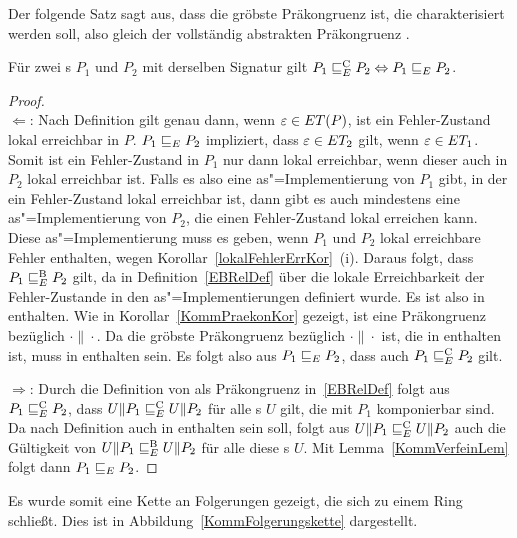 Der folgende Satz sagt aus, dass \ERel{} die gröbste Präkongruenz ist, die
charakterisiert werden soll, also gleich der vollständig abstrakten
Präkongruenz \ECRel{}.

\begin{Satz}
  \label{KommVollAbstraktSatz}
  Für zwei \MEIO{}s $P_1$ und $P_2$ mit derselben Signatur gilt $P_1 \sqsubseteq  _E^\mathrm{C}
  P_2\Leftrightarrow P_1 \sqsubseteq  _E{} P_2$.
\end{Satz}
\begin{proof}\mbox{}\\
  \glqq$\Leftarrow$\grqq: Nach Definition gilt genau dann, wenn
  $\varepsilon\in ET (P)$, ist ein Fehler-Zustand lokal erreichbar in $P$. $P_1
   \sqsubseteq  _E P_2$ impliziert, dass $\varepsilon\in ET _2$ gilt, wenn
  $\varepsilon\in ET _1$. Somit ist ein Fehler-Zustand in $P_1$ nur dann lokal
  erreichbar, wenn dieser auch in $P_2$ lokal erreichbar ist. Falls es also
  eine as"=Implementierung von $P_1$ gibt, in der ein Fehler-Zustand lokal
  erreichbar ist, dann gibt es auch mindestens eine as"=Implementierung von
  $P_2$, die einen Fehler-Zustand lokal erreichen kann. Diese
  as"=Implementierung muss es geben, wenn $P_1$ und $P_2$ lokal erreichbare
  Fehler enthalten, wegen Korollar~\ref{lokalFehlerErrKor}~(i). Daraus folgt,
  dass $P_1 \sqsubseteq  _E^\mathrm{B} P_2$ gilt, da \EBRel{} in Definition~\ref{EBRelDef} über die
  lokale Erreichbarkeit der Fehler-Zustande in den as"=Implementierungen
  definiert wurde. Es ist also \ERel{} in \EBRel{} enthalten. Wie in
  Korollar~\ref{KommPraekonKor} gezeigt, ist \ERel{} eine Präkongruenz
  bezüglich $\cdot\|\cdot$. Da \ECRel{} die gröbste Präkongruenz bezüglich
  $\cdot\|\cdot$ ist, die in \EBRel{} enthalten ist, muss \ERel{} in \ECRel{}
  enthalten sein. Es folgt also aus $P_1 \sqsubseteq  _E P_2$, dass auch $P_1 \sqsubseteq  _E^\mathrm{C} P_2$
  gilt.

  \glqq$\Rightarrow$\grqq: Durch die Definition von \ECRel{} als Präkongruenz
  in~\ref{EBRelDef} folgt aus $P_1 \sqsubseteq  _E^\mathrm{C}{} P_2$, dass $U\|P_1 \sqsubseteq  _E^\mathrm{C} U\|P_2$ für
  alle \MEIO{}s $U$ gilt, die mit $P_1$ komponierbar sind. Da \ECRel{} nach
  Definition auch in \EBRel{} enthalten sein soll, folgt aus $U\|P_1 \sqsubseteq  _E^\mathrm{C}{}
  U\|P_2$ auch die Gültigkeit von $U\|P_1 \sqsubseteq  _E^\mathrm{B}{}U\|P_2$ für alle diese
  \MEIO{}s $U$. Mit Lemma~\ref{KommVerfeinLem} folgt dann $P_1 \sqsubseteq  _E{} P_2$.
\end{proof}

Es wurde somit eine Kette an Folgerungen gezeigt, die sich zu einem Ring
schließt. Dies ist in Abbildung~\ref{KommFolgerungskette} dargestellt.

